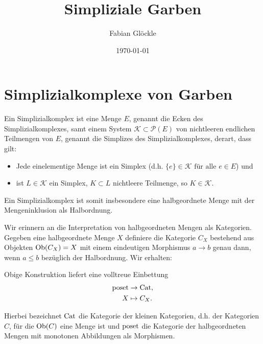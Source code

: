 



\title{Simpliziale Garben}
\author{Fabian Glöckle}
\date{\today}

\chapter{Simplizialkomplexe von Garben}

\begin{defn}
  Ein Simplizialkomplex ist eine Menge $E$, genannt die Ecken des
  Simplizialkomplexes, samt einem System $ \mathcal{K} \subset
  \mathcal{P}(E) $ von nichtleeren endlichen Teilmengen von $E$,
  genannt die Simplizes des Simplizialkomplexes, derart, dass gilt:
  \begin{itemize}
  \item Jede einelementige Menge ist ein Simplex (d.h. $\{e\} \in
    \mathcal{K} \text{ für alle } e \in E$) und
  \item ist $L \in \mathcal{K}$ ein Simplex, $K \subset L$ nichtleere
    Teilmenge, so $K \in \mathcal{K}$.
  \end{itemize}
\end{defn}

Ein Simplizialkomplex ist somit insbesondere eine halbgeordnete Menge
mit der Mengeninklusion als Halbordnung.

Wir erinnern an die Interpretation von halbgeordneten Mengen als
Kategorien. Gegeben eine halbgeordnete Menge $X$ definiere die
Kategorie $C_X$ bestehend aus Objekten $\operatorname{Ob}(C_X) = X$ mit einem
eindeutigen Morphismus $a \to b$ genau dann, wenn $a \leq b$ bezüglich
der Halbordnung. Wir erhalten:

\begin{lemma}
  Obige Konstruktion liefert eine volltreue Einbettung
  \begin{align*}
    \operatorname{poset} &\to \operatorname{Cat}, \\
    X &\mapsto C_X.    
  \end{align*}
\end{lemma}

Hierbei bezeichnet $\operatorname{Cat}$ die Kategorie der kleinen Kategorien,
d.h. der Kategorien $C$, für die $\operatorname{Ob}(C)$ eine Menge ist und $\operatorname{poset}$
die Kategorie der halbgeordneten Mengen mit monotonen Abbildungen als
Morphismen.

